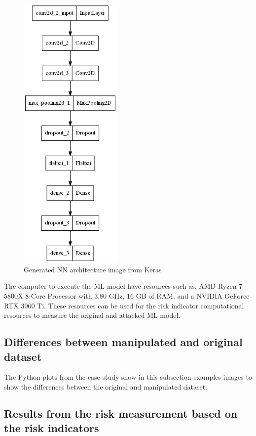 \begin{figure}[h!]
  \centering
  \includegraphics[width=5cm]{pictures/nn.png}
  \caption{Generated NN architecture image from Keras}
  \label{fig:nn}
\end{figure}

The computer to execute the ML model have resources such as, AMD Ryzen \cite{DBLP:conf/hotchips/AroraBW20} 7 5800X 8-Core Processor with 3.80 GHz, 16 GB of RAM, and a NVIDIA GeForce RTX \cite{DBLP:journals/pcs/SanzharovFG20} 3060 Ti. These resources can be used for the risk indicator computational resources to measure the original and attacked ML model.

\subsection{Differences between manipulated and original dataset}

The Python plots from the case study show in this subsection examples images to show the differences between the original and manipulated dataset.

\subsection{Results from the risk measurement based on the risk indicators}

